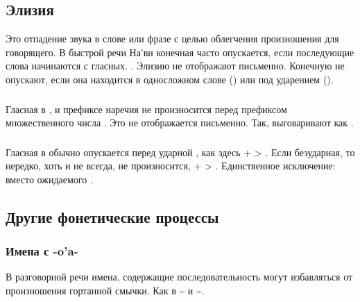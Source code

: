 \subsection{Элизия} Это отпадение звука в слове или фразе с целью облегчения произношения для говорящего. В быстрой речи На'ви конечная  часто опускается, если последующие слова начинаются с гласных.  . Элизию не отображают пись\-мен\-но.
Конечную  не опускают, если она находится в односложном слове () или под ударением ().

\subsubsection{} Гласная  в ,  и префиксе наречия  не произносится перед префиксом множественного числа . Это не отображается письменно.  Так,   вы\-го\-ва\-ри\-ва\-ют как
. \label{l-and-s:elision-i}

\subsubsection{} Гласная в  обычно опускается перед ударной , как здесь  +  > . Если 
безударная, то нередко, хоть и не всегда, не произносится,  +
 > . Единственное исключение:  вместо ожидаемого .

\subsection{Другие фонетические процессы}

\subsubsection{Имена с -o'a-} \label{names-with-oa}
В разговорной речи имена, содержащие последовательность  могут избавляться от произношения гортанной смычки. Как в  \textasciitilde{}  
и  \textasciitilde {}.


